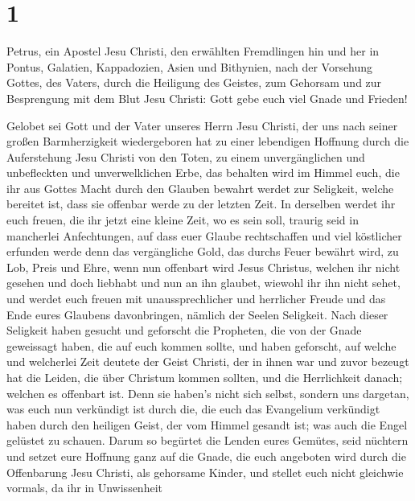 \hypertarget{section}{%
\section{1}\label{section}}

 Petrus, ein Apostel Jesu Christi, den erwählten
Fremdlingen hin und her in Pontus, Galatien, Kappadozien, Asien und
Bithynien,  nach der Vorsehung Gottes, des Vaters, durch
die Heiligung des Geistes, zum Gehorsam und zur Besprengung mit dem Blut
Jesu Christi: Gott gebe euch viel Gnade und Frieden!

 Gelobet sei Gott und der Vater unseres Herrn Jesu
Christi, der uns nach seiner großen Barmherzigkeit wiedergeboren hat zu
einer lebendigen Hoffnung durch die Auferstehung Jesu Christi von den
Toten,  zu einem unvergänglichen und unbefleckten und
unverwelklichen Erbe, das behalten wird im Himmel  euch,
die ihr aus Gottes Macht durch den Glauben bewahrt werdet zur Seligkeit,
welche bereitet ist, dass sie offenbar werde zu der letzten Zeit.
 In derselben werdet ihr euch freuen, die ihr jetzt eine
kleine Zeit, wo es sein soll, traurig seid in mancherlei Anfechtungen,
 auf dass euer Glaube rechtschaffen und viel köstlicher
erfunden werde denn das vergängliche Gold, das durchs Feuer bewährt
wird, zu Lob, Preis und Ehre, wenn nun offenbart wird Jesus Christus,
 welchen ihr nicht gesehen und doch liebhabt und nun an
ihn glaubet, wiewohl ihr ihn nicht sehet, und werdet euch freuen mit
unaussprechlicher und herrlicher Freude  und das Ende
eures Glaubens davonbringen, nämlich der Seelen Seligkeit.
 Nach dieser Seligkeit haben gesucht und geforscht die
Propheten, die von der Gnade geweissagt haben, die auf euch kommen
sollte,  und haben geforscht, auf welche und welcherlei
Zeit deutete der Geist Christi, der in ihnen war und zuvor bezeugt hat
die Leiden, die über Christum kommen sollten, und die Herrlichkeit
danach;  welchen es offenbart ist. Denn sie haben's nicht
sich selbst, sondern uns dargetan, was euch nun verkündigt ist durch
die, die euch das Evangelium verkündigt haben durch den heiligen Geist,
der vom Himmel gesandt ist; was auch die Engel gelüstet zu schauen.
 Darum so begürtet die Lenden eures Gemütes, seid
nüchtern und setzet eure Hoffnung ganz auf die Gnade, die euch angeboten
wird durch die Offenbarung Jesu Christi,  als gehorsame
Kinder, und stellet euch nicht gleichwie vormals, da ihr in Unwissenheit
